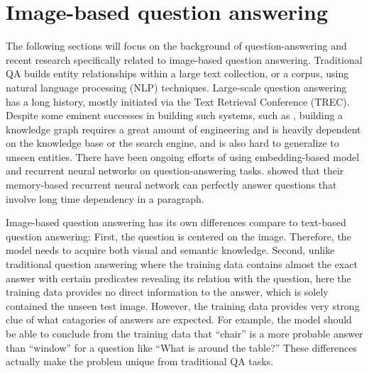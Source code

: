 \section{Image-based question answering}
The following sections will focus on the background of question-answering and recent research specifically related to image-based question answering. Traditional QA builds entity relationships within a large text collection, or a corpus, using natural language processing (NLP) techniques. Large-scale question answering has a long history, mostly initiated via the Text Retrieval Conference (TREC). Despite some eminent successes in building such systems, such as \cite{lewis12}, building a knowledge graph requires a great amount of engineering and is heavily dependent on the knowledge base or the search engine, and is also hard to generalize to unseen entities. There have been ongoing efforts of using embedding-based model and recurrent neural networks on question-answering tasks. \cite{weston14} showed that their memory-based recurrent neural network can perfectly answer questions that involve long time dependency in a paragraph.

Image-based question answering has its own differences compare to text-based question answering:
First, the question is centered on the image. Therefore, the model needs to acquire both visual and semantic knowledge.
Second, unlike traditional question answering where the training data contains almost the exact answer with certain predicates revealing its relation with the question, here the training data provides no direct information to the answer, which is solely contained the unseen test image. However, the training data provides very strong clue of what catagories of answers are expected. For example, the model should be able to conclude from the training data that ``chair'' is a more probable answer than ``window'' for a question like ``What is around the table?''  These differences actually make the problem unique from traditional QA tasks.

